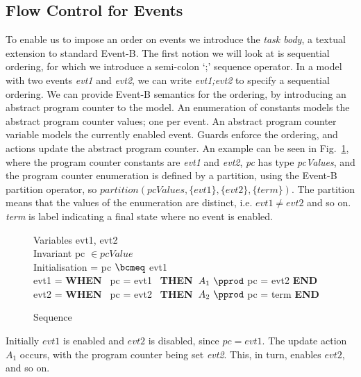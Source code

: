 \subsection{Flow Control for Events}
To enable us to impose an order on events we introduce the \emph{task body}, a textual extension to standard Event-B. The first notion we will look at is sequential ordering, for which we introduce a semi-colon `;' sequence operator. In a model with two events \emph{evt1} and \emph{evt2}, we can write \emph{evt1;evt2} to specify a sequential ordering. We can provide Event-B semantics for the ordering, by introducing an abstract program counter to the model. An enumeration of constants models the abstract program counter values; one per event. An abstract program counter variable models the currently enabled event. Guards enforce the ordering, and actions update the abstract program counter. An example can be seen in Fig.~\ref{fig:seq}, where the program counter constants are \emph{evt1} and \emph{evt2}, \emph{pc} has type \emph{pcValues}, and the program counter enumeration is defined by a partition, using the Event-B partition operator, so $partition(pcValues, \{evt1\}, \{evt2\},\{term\})$. The partition means that the values of the enumeration are distinct, i.e. $evt1 \neq evt2$ and so on. \emph{term} is label indicating a final state where no event is enabled.
%
\begin{figure}
\centering
\begin{minipage}{0.7\textwidth}
Variables evt1, evt2\\
Invariant pc $\in pcValue$ \\
Initialisation = pc $\bcmeq$ evt1 \\
evt1 = \textbf{WHEN}~ pc = evt1~ \textbf{THEN}~$A_1~ \pprod$ pc = evt2 \textbf{END}\\
evt2 = \textbf{WHEN}~ pc = evt2~ \textbf{THEN}~$A_2~ \pprod$ pc = term \textbf{END}\\
\end{minipage}
\caption{Sequence}
\label{fig:seq}
\end{figure}
Initially $evt1$ is enabled and $evt2$ is disabled, since $pc = evt1$. The update action $A_1$ occurs, with the program counter being set \emph{evt2}. This, in turn, enables $evt2$, and so on.
